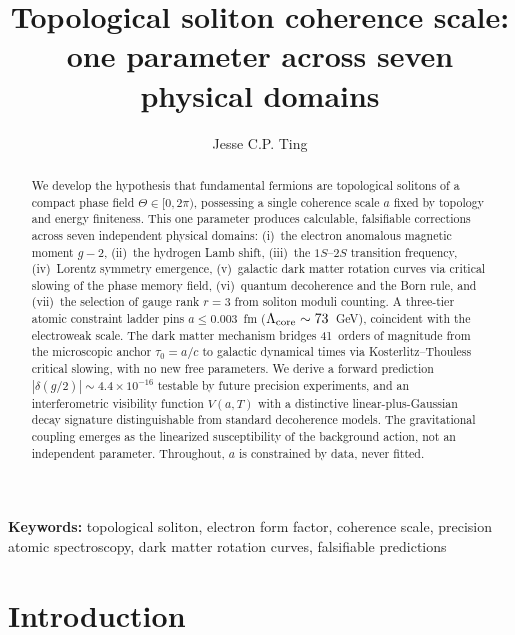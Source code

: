 ﻿\documentclass[a4paper,12pt]{article}
\begin{document}
\title{Topological soliton coherence scale:\\
  one parameter across seven physical domains}

\author{Jesse C.P. Ting}



\begin{abstract}
We develop the hypothesis that fundamental fermions are topological
solitons of a compact phase field $\Theta\in[0,2\pi)$, possessing a
single coherence scale $a$ fixed by topology and energy finiteness.
This one parameter produces calculable, falsifiable corrections across
seven independent physical domains: (i)~the electron anomalous magnetic
moment $g{-}2$, (ii)~the hydrogen Lamb shift, (iii)~the $1S$--$2S$
transition frequency, (iv)~Lorentz symmetry emergence, (v)~galactic
dark matter rotation curves via critical slowing of the phase memory
field, (vi)~quantum decoherence and the Born rule, and (vii)~the
selection of gauge rank $r=3$ from soliton moduli counting.  A
three-tier atomic constraint ladder pins $a\leq 0.003$~fm
($\Lambda_{\rm core}\sim 73$~GeV), coincident with the electroweak
scale.  The dark matter mechanism bridges 41~orders of magnitude from
the microscopic anchor $\tau_0 = a/c$ to galactic dynamical times via
Kosterlitz--Thouless critical slowing, with no new free parameters.
We derive a forward prediction $|\delta(g/2)|\sim 4.4\times 10^{-16}$
testable by future precision experiments, and an interferometric
visibility function $V(a,T)$ with a distinctive linear-plus-Gaussian
decay signature distinguishable from standard decoherence models.
The gravitational coupling emerges as the linearized susceptibility
of the background action, not an independent parameter.  Throughout,
$a$ is constrained by data, never fitted.
\end{abstract}

\maketitle

\noindent\textbf{Keywords:} topological soliton, electron form factor, coherence scale, precision atomic spectroscopy, dark matter rotation curves, falsifiable predictions



\section{Introduction}
\label{sec:intro}
\end{document}
